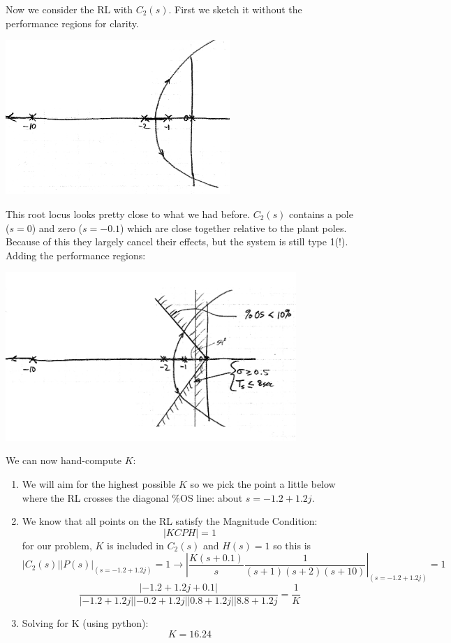 \begin{ExampleCont}
Now we consider the RL with $C_2(s)$.   First we sketch it without
the performance regions for clarity.

\includegraphics[width=85mm]{figs09/01109.png}

This root locus looks pretty close to what we had before.
 $C_2(s)$ contains a pole ($s=0$) and zero ($s=-0.1$) which are close together relative to the plant poles.  Because
 of this they largely cancel their effects, but the system is still type 1(!).  Adding the performance regions:

 \includegraphics[width=110mm]{figs09/01110.png}

 We can now hand-compute $K$:

 \begin{enumerate}
   \item We will aim for the highest possible $K$ so we pick the point a little below where the RL crosses the diagonal \%OS line:
   about $s = -1.2+1.2j$.
   \item We know that all points on the RL satisfy the Magnitude Condition:
   \[
   |KCPH| = 1
   \]
   for our problem, $K$ is included in $C_2(s)$ and $H(s) =1$  so this is
   \[
   |C_2(s)||P(s)|_{(s=-1.2+1.2j)} = 1 \to
     \left | \frac   {K(s+0.1)} {s} \frac  {1}   {(s+1)(s+2)(s+10)}  \right |_{(s=-1.2+1.2j)}=1
   \]
   \[
   \frac   {|-1.2+1.2j+0.1|} {|-1.2+1.2j||-0.2+1.2j||0.8+1.2j||8.8+1.2j} = \frac {1}  {K}
   \]
   \item Solving for K (using python):
   \[
   K = 16.24
   \]

 \end{enumerate}
\end{ExampleCont}
